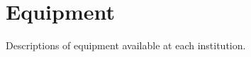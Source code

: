 \chapter{Equipment}
\label{sec:equipment}



\vspace{0.5in}
\noindent Descriptions of equipment available at 
each institution.

\etocsettocstyle{}{}
\etocchecksemptiness
{}


